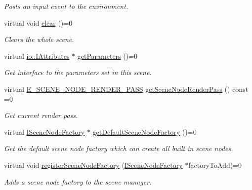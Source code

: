 \begin{DoxyCompactItemize}
\begin{DoxyCompactList}\small\item\em Posts an input event to the environment. \end{DoxyCompactList}\item 
virtual void \hyperlink{classirr_1_1scene_1_1ISceneManager_abaa3d11a833b89f7579848e234881988}{clear} ()=0
\begin{DoxyCompactList}\small\item\em Clears the whole scene. \end{DoxyCompactList}\item 
virtual \hyperlink{classirr_1_1io_1_1IAttributes}{io\+::\+I\+Attributes} $\ast$ \hyperlink{classirr_1_1scene_1_1ISceneManager_a4dba8ee7f48fdf6ede2c3f4b5fabcad3}{get\+Parameters} ()=0
\begin{DoxyCompactList}\small\item\em Get interface to the parameters set in this scene. \end{DoxyCompactList}\item 
virtual \hyperlink{namespaceirr_1_1scene_a7862269bd1abc123929d4dbb8200d67f}{E\+\_\+\+S\+C\+E\+N\+E\+\_\+\+N\+O\+D\+E\+\_\+\+R\+E\+N\+D\+E\+R\+\_\+\+P\+A\+SS} \hyperlink{classirr_1_1scene_1_1ISceneManager_a2b8f844a1367d80648bc055a5639807b}{get\+Scene\+Node\+Render\+Pass} () const =0
\begin{DoxyCompactList}\small\item\em Get current render pass. \end{DoxyCompactList}\item 
virtual \hyperlink{classirr_1_1scene_1_1ISceneNodeFactory}{I\+Scene\+Node\+Factory} $\ast$ \hyperlink{classirr_1_1scene_1_1ISceneManager_a1ea0ec7ec95a97819f1de5222b97e774}{get\+Default\+Scene\+Node\+Factory} ()=0
\begin{DoxyCompactList}\small\item\em Get the default scene node factory which can create all built in scene nodes. \end{DoxyCompactList}\item 
virtual void \hyperlink{classirr_1_1scene_1_1ISceneManager_a75ac9315def74ae5e26a2d6a2f5a38e9}{register\+Scene\+Node\+Factory} (\hyperlink{classirr_1_1scene_1_1ISceneNodeFactory}{I\+Scene\+Node\+Factory} $\ast$factory\+To\+Add)=0
\begin{DoxyCompactList}\small\item\em Adds a scene node factory to the scene manager. \end{DoxyCompactList}\item 

\end{DoxyCompactItemize}
